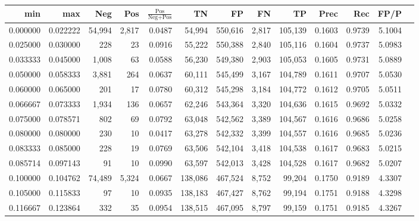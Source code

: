\begin{tabular}{rrrrrrrrrrrrr}
\toprule
     min &      max &    Neg &    Pos & $\frac{\text{Pos}}{\text{Neg}+\text{Pos}}$ &      TN &      FP &      FN &      TP &   Prec &    Rec &   FP/P \\
\midrule
0.000000 & 0.022222 & 54,994 &  2,817 &                                     0.0487 &  54,994 & 550,616 &   2,817 & 105,139 & 0.1603 & 0.9739 & 5.1004 \\
0.025000 & 0.030000 &    228 &     23 &                                     0.0916 &  55,222 & 550,388 &   2,840 & 105,116 & 0.1604 & 0.9737 & 5.0983 \\
0.033333 & 0.045000 &  1,008 &     63 &                                     0.0588 &  56,230 & 549,380 &   2,903 & 105,053 & 0.1605 & 0.9731 & 5.0889 \\
0.050000 & 0.058333 &  3,881 &    264 &                                     0.0637 &  60,111 & 545,499 &   3,167 & 104,789 & 0.1611 & 0.9707 & 5.0530 \\
0.060000 & 0.065000 &    201 &     17 &                                     0.0780 &  60,312 & 545,298 &   3,184 & 104,772 & 0.1612 & 0.9705 & 5.0511 \\
0.066667 & 0.073333 &  1,934 &    136 &                                     0.0657 &  62,246 & 543,364 &   3,320 & 104,636 & 0.1615 & 0.9692 & 5.0332 \\
0.075000 & 0.078571 &    802 &     69 &                                     0.0792 &  63,048 & 542,562 &   3,389 & 104,567 & 0.1616 & 0.9686 & 5.0258 \\
0.080000 & 0.080000 &    230 &     10 &                                     0.0417 &  63,278 & 542,332 &   3,399 & 104,557 & 0.1616 & 0.9685 & 5.0236 \\
0.083333 & 0.085000 &    228 &     19 &                                     0.0769 &  63,506 & 542,104 &   3,418 & 104,538 & 0.1617 & 0.9683 & 5.0215 \\
0.085714 & 0.097143 &     91 &     10 &                                     0.0990 &  63,597 & 542,013 &   3,428 & 104,528 & 0.1617 & 0.9682 & 5.0207 \\
0.100000 & 0.104762 & 74,489 &  5,324 &                                     0.0667 & 138,086 & 467,524 &   8,752 &  99,204 & 0.1750 & 0.9189 & 4.3307 \\
0.105000 & 0.115833 &     97 &     10 &                                     0.0935 & 138,183 & 467,427 &   8,762 &  99,194 & 0.1751 & 0.9188 & 4.3298 \\
0.116667 & 0.123864 &    332 &     35 &                                     0.0954 & 138,515 & 467,095 &   8,797 &  99,159 & 0.1751 & 0.9185 & 4.3267 \\

\end{tabular}
